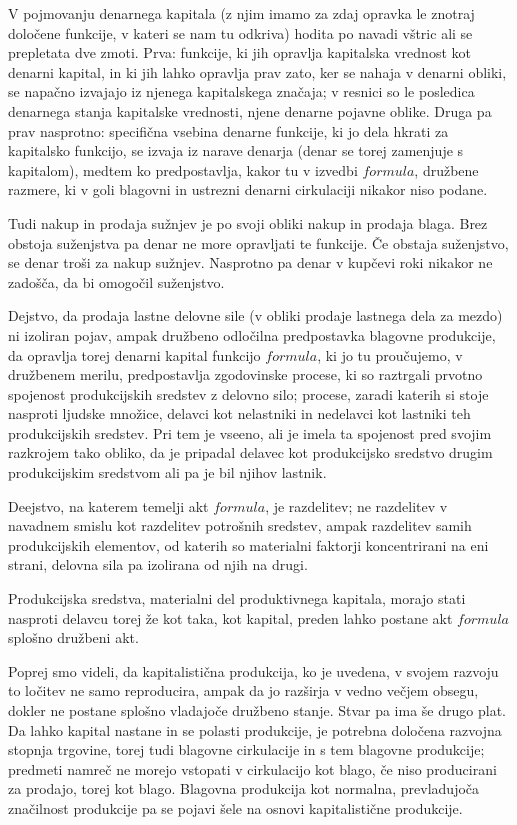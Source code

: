 \documentclass[a5paper]{scrbook}
\begin{document}
V pojmovanju denarnega kapitala (z njim imamo za zdaj opravka le znotraj določene funkcije, v kateri se nam tu odkriva) hodita po navadi vštric ali se prepletata dve zmoti. Prva: funkcije, ki jih opravlja kapitalska vrednost kot denarni kapital, in ki jih lahko opravlja prav zato, ker se nahaja v denarni obliki, se napačno izvajajo iz njenega kapitalskega značaja; v resnici so le posledica denarnega stanja kapitalske vrednosti, njene denarne pojavne oblike. Druga pa prav nasprotno: specifična vsebina denarne funkcije, ki jo dela hkrati za kapitalsko funkcijo, se izvaja iz narave denarja (denar se torej zamenjuje s kapitalom), medtem ko predpostavlja, kakor tu v izvedbi \( formula \), družbene razmere, ki v goli blagovni in ustrezni denarni cirkulaciji nikakor niso podane.

Tudi nakup in prodaja sužnjev je po svoji obliki nakup in prodaja blaga. Brez obstoja suženjstva pa denar ne more opravljati te funkcije. Če obstaja suženjstvo, se denar troši za nakup sužnjev. Nasprotno pa denar v kupčevi roki nikakor ne zadošča, da bi omogočil suženjstvo.

Dejstvo, da prodaja lastne delovne sile (v obliki prodaje lastnega dela za mezdo) ni izoliran pojav, ampak družbeno odločilna predpostavka blagovne produkcije, da opravlja torej denarni kapital funkcijo \( formula \), ki jo tu proučujemo, v družbenem merilu, predpostavlja zgodovinske procese, ki so raztrgali prvotno spojenost produkcijskih sredstev z delovno silo; procese, zaradi katerih si stoje nasproti ljudske množice, delavci kot nelastniki in nedelavci kot lastniki teh produkcijskih sredstev. Pri tem je vseeno, ali je imela ta spojenost pred svojim razkrojem tako obliko, da je pripadal delavec kot produkcijsko sredstvo drugim produkcijskim sredstvom ali pa je bil njihov lastnik.

Deejstvo, na katerem temelji akt \( formula \), je razdelitev; ne razdelitev v navadnem smislu kot razdelitev potrošnih sredstev, ampak razdelitev samih produkcijskih elementov, od katerih so materialni faktorji koncentrirani na eni strani, delovna sila pa izolirana od njih na drugi.

Produkcijska sredstva, materialni del produktivnega kapitala, morajo stati nasproti delavcu torej že kot taka, kot kapital, preden lahko postane akt \( formula \) splošno družbeni akt.

Poprej smo videli, da kapitalistična produkcija, ko je uvedena, v svojem razvoju to ločitev ne samo reproducira, ampak da jo razširja v vedno večjem obsegu, dokler ne postane splošno vladajoče družbeno stanje. Stvar pa ima še drugo plat. Da lahko kapital nastane in se polasti produkcije, je potrebna določena razvojna stopnja trgovine, torej tudi blagovne cirkulacije in s tem blagovne produkcije; predmeti namreč ne morejo vstopati v cirkulacijo kot blago, če niso producirani za prodajo, torej kot blago. Blagovna produkcija kot normalna, prevladujoča značilnost produkcije pa se pojavi šele na osnovi kapitalistične produkcije.
\end{document}
